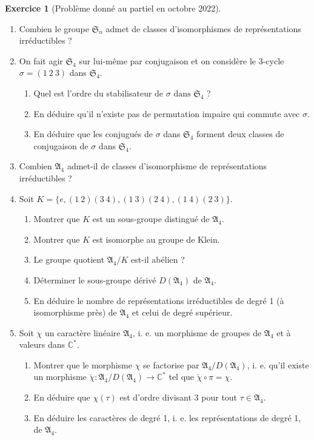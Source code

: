 \documentclass[french]{book}
\theoremstyle{definition}
\newtheorem{exo}{Exercice}
\begin{document}
\begin{exo}[Problème donné au partiel en octobre 2022]

  \

  \begin{enumerate}
    \item Combien le groupe \(\mathfrak{S}_n\) admet de classes d'isomorphismes de représentations irréductibles ?
    \item On fait agir \(\mathfrak{S}_{4}\) sur lui-même par conjugaison et on considère le 3-cycle \(\sigma = (1 \ 2 \ 3)\) dans \(\mathfrak{S}_{4}\).
    \begin{enumerate}
      \item Quel est l'ordre du stabilisateur de \(\sigma \text{ dans } \mathfrak{S}_{4}\) ?
      \item En déduire qu'il n'existe pas de permutation impaire qui commute avec \(\sigma\).
      \item En déduire que les conjugués de \(\sigma\) dans \(\mathfrak{S}_{4}\) forment deux classes de conjugaison de \(\sigma\) dans \(\mathfrak{S}_{4}\).
    \end{enumerate}
    \item Combien \(\mathfrak{A}_4\) admet-il de classes d'isomorphisme de représentations irréductibles ?
    \item Soit \(K = \{ e, (1 \ 2)(3 \ 4), (1 \ 3)(2 \ 4), (1 \ 4)(2 \ 3)\}\).
    \begin{enumerate}
      \item Montrer que \(K\) est un sous-groupe distingué de \(\mathfrak{A}_{4}\).
      \item Montrer que \(K\) est isomorphe au groupe de Klein.
      \item Le groupe quotient \(\mathfrak{A}_4/ K\) est-il abélien ?
      \item Déterminer le sous-groupe dérivé \(D(\mathfrak{A}_{4})\) de \(\mathfrak{A}_4\).
      \item En déduire le nombre de représentations irréductibles de degré 1 (à isomorphisme près) de \(\mathfrak{A}_4\) et celui de degré supérieur.
    \end{enumerate}

    \item {} Soit \(\chi\) un caractère linéaire \(\mathfrak{A}_4\), i. e. un morphisme de groupes de \(\mathfrak{A}_4\) et à valeurs dans \(\mathbb{C}^*\).

    \begin{enumerate}
      \item Montrer que le morphisme \(\chi\) se factorise par \(\mathfrak{A}_4 / D(\mathfrak{A}_4)\), i. e. qu'il existe un morphisme \(\check{\chi} : \mathfrak{A}_4 / D(\mathfrak{A}_4) \longrightarrow \mathbb{C}^{*}\) tel que \(\check{\chi} \circ \pi = \chi\).
      \item En déduire que \(\chi(\tau)\) est d'ordre divisant 3 pour tout \(\tau \in \mathfrak{A}_{4}\).
      \item En déduire les caractères de degré 1, i. e. les représentations de degré 1, de \(\mathfrak{A}_{4}\).
    \end{enumerate}


\end{enumerate}
\end{exo}
\end{document}
